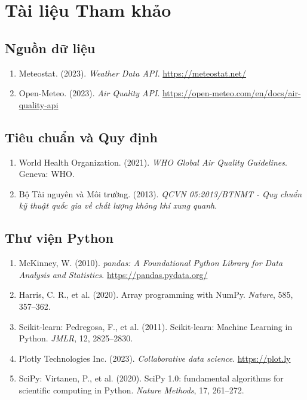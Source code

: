 \documentclass[12pt,a4paper]{article}
\begin{document}
\section{Tài liệu Tham khảo}

\subsection{Nguồn dữ liệu}
\begin{enumerate}
    \item Meteostat. (2023). \textit{Weather Data API}. \url{https://meteostat.net/}
    \item Open-Meteo. (2023). \textit{Air Quality API}. \url{https://open-meteo.com/en/docs/air-quality-api}
\end{enumerate}

\subsection{Tiêu chuẩn và Quy định}
\begin{enumerate}
    \item World Health Organization. (2021). \textit{WHO Global Air Quality Guidelines}. Geneva: WHO.
    \item Bộ Tài nguyên và Môi trường. (2013). \textit{QCVN 05:2013/BTNMT - Quy chuẩn kỹ thuật quốc gia về chất lượng không khí xung quanh}.
\end{enumerate}

\subsection{Thư viện Python}
\begin{enumerate}
    \item McKinney, W. (2010). \textit{pandas: A Foundational Python Library for Data Analysis and Statistics}. \url{https://pandas.pydata.org/}
    \item Harris, C. R., et al. (2020). Array programming with NumPy. \textit{Nature}, 585, 357–362.
    \item Scikit-learn: Pedregosa, F., et al. (2011). Scikit-learn: Machine Learning in Python. \textit{JMLR}, 12, 2825–2830.
    \item Plotly Technologies Inc. (2023). \textit{Collaborative data science}. \url{https://plot.ly}
    \item SciPy: Virtanen, P., et al. (2020). SciPy 1.0: fundamental algorithms for scientific computing in Python. \textit{Nature Methods}, 17, 261–272.
\end{enumerate}
\end{document}
